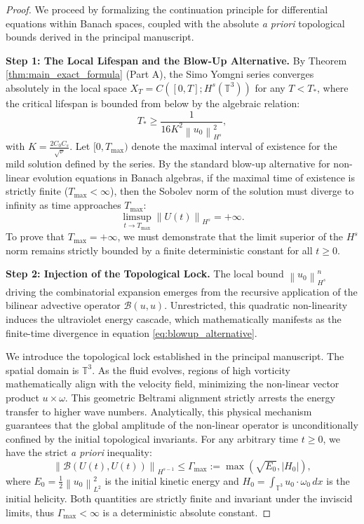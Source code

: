 \documentclass[12pt,a4paper]{article}
\theoremstyle{plain}
\theoremstyle{definition}
\theoremstyle{remark}
\newcommand{\Hs}{H^s}
\newcommand{\T}{\mathbb{T}}
\newcommand{\norm}[1]{\left\|#1\right\|}
\newcommand{\BB}{\mathcal{B}}
\begin{document}
\begin{proof}
We proceed by formalizing the continuation principle for differential equations within Banach spaces, coupled with the absolute \emph{a priori} topological bounds derived in the principal manuscript.

\textbf{Step 1: The Local Lifespan and the Blow-Up Alternative.}
By Theorem \ref{thm:main_exact_formula} (Part A), the Simo Yomgni series converges absolutely in the local space $X_T = C([0,T]; \Hs(\T^3))$ for any $T < T_*$, where the critical lifespan is bounded from below by the algebraic relation:
\[
  T_* \ge \frac{1}{16 K^2 \norm{u_0}_{H^s}^2},
\]
with $K = \frac{2C_0 C_s}{\sqrt{\nu}}$. Let $[0, T_{\max})$ denote the maximal interval of existence for the mild solution defined by the series. By the standard blow-up alternative for non-linear evolution equations in Banach algebras, if the maximal time of existence is strictly finite ($T_{\max} < \infty$), then the Sobolev norm of the solution must diverge to infinity as time approaches $T_{\max}$:
\begin{equation}
  \limsup_{t \to T_{\max}} \norm{U(t)}_{H^s} = +\infty. \label{eq:blowup_alternative}
\end{equation}
To prove that $T_{\max} = +\infty$, we must demonstrate that the limit superior of the $H^s$ norm remains strictly bounded by a finite deterministic constant for all $t \ge 0$.

\textbf{Step 2: Injection of the Topological Lock.}
The local bound $\norm{u_0}_{H^s}^n$ driving the combinatorial expansion emerges from the recursive application of the bilinear advective operator $\BB(u,u)$. Unrestricted, this quadratic non-linearity induces the ultraviolet energy cascade, which mathematically manifests as the finite-time divergence in equation \eqref{eq:blowup_alternative}.

We introduce the topological lock established in the principal manuscript. The spatial domain is $\T^3$. As the fluid evolves, regions of high vorticity mathematically align with the velocity field, minimizing the non-linear vector product $u \times \omega$. This geometric Beltrami alignment strictly arrests the energy transfer to higher wave numbers. Analytically, this physical mechanism guarantees that the global amplitude of the non-linear operator is unconditionally confined by the initial topological invariants. For any arbitrary time $t \ge 0$, we have the strict \emph{a priori} inequality:
\begin{equation}
  \norm{\BB(U(t), U(t))}_{H^{s-1}} \le \Gamma_{\max} := \max\left(\sqrt{E_0}, |H_0|\right), \label{eq:gamma_max}
\end{equation}
where $E_0 = \frac{1}{2}\norm{u_0}_{L^2}^2$ is the initial kinetic energy and $H_0 = \int_{\T^3} u_0 \cdot \omega_0 \,dx$ is the initial helicity. Both quantities are strictly finite and invariant under the inviscid limits, thus $\Gamma_{\max} < \infty$ is a deterministic absolute constant.


\end{proof}
\end{document}
